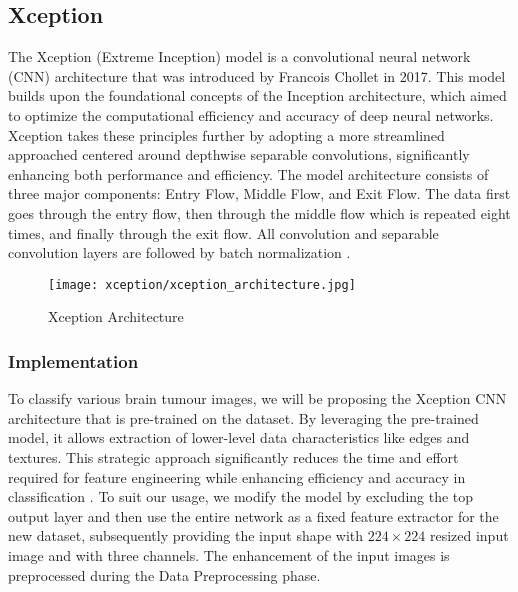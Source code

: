 \subsection{Xception}\label{s:xception}


The Xception (Extreme Inception) model is a convolutional neural network (CNN) architecture that was introduced by Francois Chollet in 2017. This model builds upon the foundational concepts of the Inception architecture, which aimed to optimize the computational efficiency and accuracy of deep neural networks. Xception takes these principles further by adopting a more streamlined approached centered around depthwise separable convolutions, significantly enhancing both performance and efficiency. The model architecture consists of three major components: Entry Flow, Middle Flow, and Exit Flow. The data first goes through the entry flow, then through the middle flow which is repeated eight times, and finally through the exit flow. All convolution and separable convolution layers are followed by batch normalization \cite{Francois_Chollet}.

\begin{figure}[H]
  \begin{center}
    \texttt{[image: xception/xception\_architecture.jpg]}
  \end{center}
  \caption{Xception Architecture}\label{f:xception_architecture}
\end{figure}

\subsubsection{Implementation}

To classify various brain tumour images, we will be proposing the Xception CNN architecture that is pre-trained on the \cite{ImageNet} dataset. By leveraging the pre-trained model, it allows extraction of lower-level data characteristics like edges and textures. This strategic approach significantly reduces the time and effort required for feature engineering while enhancing efficiency and accuracy in classification \cite{Pre-trainedModel}. To suit our usage, we modify the model by excluding the top output layer and then use the entire network as a fixed feature extractor for the new dataset, subsequently providing the input shape with $224\times224$ resized input image and with three channels. The enhancement of the input images is preprocessed during the Data Preprocessing phase.

